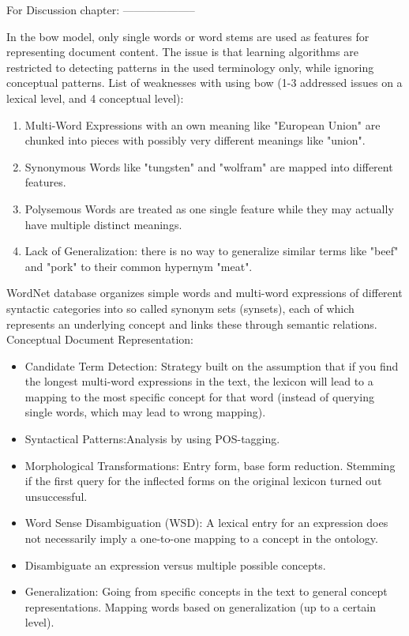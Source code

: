 \label{chap:chapter5}




For Discussion chapter:
--------------------

In the \gls{bow} model, only single words or word stems are used as features for representing document content. 
The issue is that learning algorithms are restricted to detecting patterns in the used terminology only, while ignoring conceptual patterns. 
List of weaknesses with using \gls{bow} (1-3 addressed issues on a lexical level, and 4 conceptual level):
\begin{enumerate}
	\item Multi-Word Expressions with an own meaning like "European Union" are chunked into pieces with possibly very different meanings like "union".
	\item Synonymous Words like "tungsten" and "wolfram" are mapped into different features.
	\item Polysemous Words are treated as one single feature while they may actually have multiple distinct meanings.
	\item Lack of Generalization: there is no way to generalize similar terms like "beef" and "pork" to their common hypernym "meat".
\end{enumerate}
WordNet database organizes simple words and multi-word expressions of different syntactic categories into so called synonym sets (synsets), 
each of which represents an underlying concept and links these through semantic relations. \\
Conceptual Document Representation:
\begin{itemize}
	\item Candidate Term Detection: Strategy built on the assumption that if you find the longest multi-word expressions in the text, 
	the lexicon will lead to a mapping to the most specific concept for that word (instead of querying single words, which may lead to wrong mapping).
	\item Syntactical Patterns:Analysis by using POS-tagging.
	\item Morphological Transformations: Entry form, base form reduction. 
	Stemming if the first query for the inflected forms on the original lexicon turned out unsuccessful.
	\item Word Sense Disambiguation (WSD): A lexical entry for an expression does not necessarily imply a one-to-one mapping to a concept in the ontology. 
	\item Disambiguate an expression versus multiple possible concepts.
	\item Generalization: Going from specific concepts in the text to general concept representations. Mapping words based on generalization (up to a certain level).
\end{itemize}
\cite{Bloehdorn2004}

